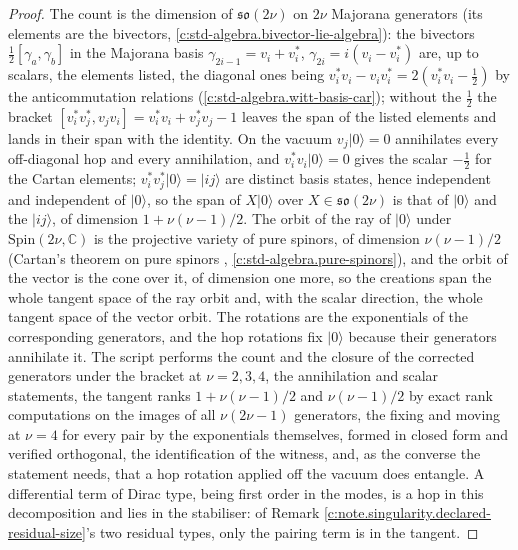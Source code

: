 \documentclass[11pt]{article}
\theoremstyle{definition}
\theoremstyle{plain}
\providecommand{\C}{}\renewcommand{\C}{\mathbb{C}}
\begin{document}
\begin{proof}
The count is the dimension of $\mathfrak{so}(2\nu)$ on $2\nu$ Majorana generators (its elements are the bivectors, \ref{c:std-algebra.bivector-lie-algebra}): the bivectors $\tfrac12[\gamma_a, \gamma_b]$ in the Majorana basis $\gamma_{2i-1} = v_i + v^*_i$, $\gamma_{2i} = i(v_i - v^*_i)$ are, up to scalars, the elements listed, the diagonal ones being $v^*_i v_i - v_i v^*_i = 2(v^*_i v_i - \tfrac12)$ by the anticommutation relations (\ref{c:std-algebra.witt-basis-car}); without the $\tfrac12$ the bracket $[v^*_i v^*_j, v_j v_i] = v^*_i v_i + v^*_j v_j - 1$ leaves the span of the listed elements and lands in their span with the identity. On the vacuum $v_j|0\rangle = 0$ annihilates every off-diagonal hop and every annihilation, and $v^*_i v_i|0\rangle = 0$ gives the scalar $-\tfrac12$ for the Cartan elements; $v^*_i v^*_j|0\rangle = |ij\rangle$ are distinct basis states, hence independent and independent of $|0\rangle$, so the span of $X|0\rangle$ over $X \in \mathfrak{so}(2\nu)$ is that of $|0\rangle$ and the $|ij\rangle$, of dimension $1 + \nu(\nu - 1)/2$. The orbit of the ray of $|0\rangle$ under $\mathrm{Spin}(2\nu, \C)$ is the projective variety of pure spinors, of dimension $\nu(\nu - 1)/2$ (Cartan's theorem on pure spinors \cite{Chevalley1954}, \ref{c:std-algebra.pure-spinors}), and the orbit of the vector is the cone over it, of dimension one more, so the creations span the whole tangent space of the ray orbit and, with the scalar direction, the whole tangent space of the vector orbit. The rotations are the exponentials of the corresponding generators, and the hop rotations fix $|0\rangle$ because their generators annihilate it. The script performs the count and the closure of the corrected generators under the bracket at $\nu = 2, 3, 4$, the annihilation and scalar statements, the tangent ranks $1 + \nu(\nu - 1)/2$ and $\nu(\nu - 1)/2$ by exact rank computations on the images of all $\nu(2\nu - 1)$ generators, the fixing and moving at $\nu = 4$ for every pair by the exponentials themselves, formed in closed form and verified orthogonal, the identification of the witness, and, as the converse the statement needs, that a hop rotation applied off the vacuum does entangle. A differential term of Dirac type, being first order in the modes, is a hop in this decomposition and lies in the stabiliser: of Remark \ref{c:note.singularity.declared-residual-size}'s two residual types, only the pairing term is in the tangent.

\end{proof}
\end{document}
